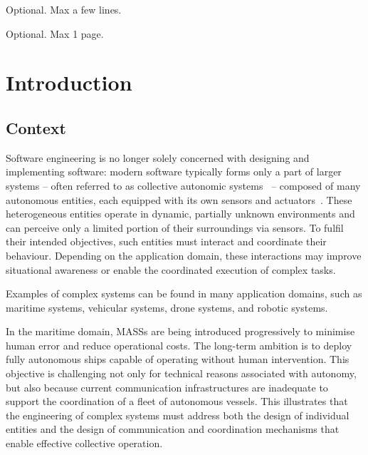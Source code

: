 \documentclass[12pt,a4paper,openright,twoside]{book}
\begin{document}
	
\frontmatter


\begin{abstract}	
Max 2000 characters, strict.
\end{abstract}

\begin{dedication} %
Optional. Max a few lines.
\end{dedication}

\begin{acknowledgements} %
Optional. Max 1 page.
\end{acknowledgements}

\tableofcontents   


\mainmatter

\chapter{Introduction}
\label{chap:introduction}

\section{Context}
Software engineering is no longer solely concerned with designing and implementing software:
modern software typically forms only a part of larger systems %
-- often referred to as collective autonomic systems~\cite{belzner2016fomac} -- 
composed of many autonomous entities, each equipped with its own sensors and actuators~\cite{6114583}.
%
These heterogeneous entities operate in dynamic, 
partially unknown environments 
and can perceive only a limited portion of their surroundings via sensors. 
%
To fulfil their intended objectives, 
such entities must interact and coordinate their behaviour. 
%
Depending on the application domain, 
these interactions may improve situational awareness 
or enable the coordinated execution of complex tasks.

Examples of complex systems can be found in many application domains,
such as maritime systems,
vehicular systems,
drone systems,
and robotic systems.

%
In the maritime domain, 
\acp{MASS} are being introduced progressively 
to minimise human error and reduce operational costs. 
%
The long-term ambition is to deploy fully autonomous ships 
capable of operating without human intervention. 
%
This objective is challenging not only for technical reasons associated with autonomy, 
but also because current communication infrastructures are inadequate 
to support the coordination of a fleet of autonomous vessels. 
%
This illustrates that the engineering of complex systems must address both 
the design of individual entities 
and the design of communication and coordination mechanisms 
that enable effective collective operation.
\end{document}
